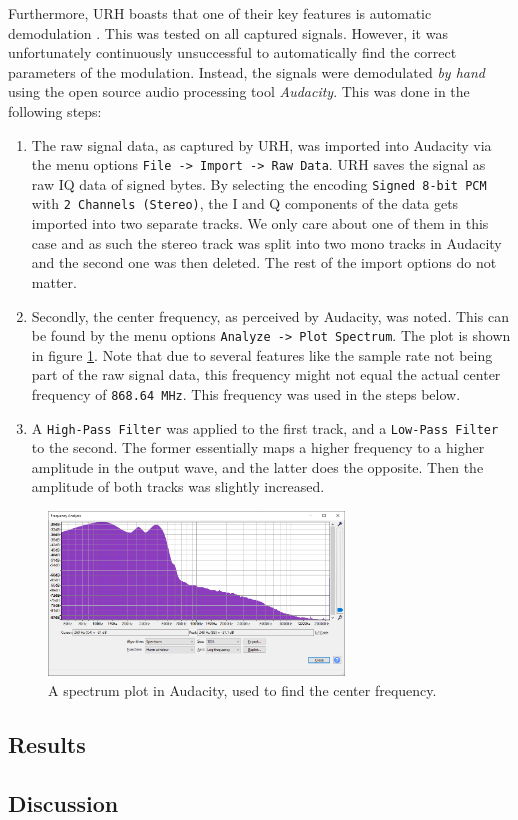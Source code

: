 Furthermore, \gls{URH} boasts that one of their key features is automatic demodulation \cite{urh}. This was tested on all captured signals. However, it was unfortunately continuously unsuccessful to automatically find the correct parameters of the modulation. Instead, the signals were demodulated \textit{by hand} using the open source audio processing tool \textit{Audacity}. This was done in the following steps:
\begin{enumerate}
    \item The raw signal data, as captured by URH, was imported into Audacity via the menu options \texttt{File -> Import -> Raw Data}. URH saves the signal as raw IQ data of signed bytes. By selecting the encoding \texttt{Signed 8-bit PCM} with \texttt{2 Channels (Stereo)}, the I and Q components of the data gets imported into two separate tracks. We only care about one of them in this case and as such the stereo track was split into two mono tracks in Audacity and the second one was then deleted. The rest of the import options do not matter.
    \item Secondly, the center frequency, as perceived by Audacity, was noted. This can be found by the menu options \texttt{Analyze -> Plot Spectrum}. The plot is shown in figure \ref{fig:audacity-spectrum}. Note that due to several features like the sample rate not being part of the raw signal data, this frequency might not equal the actual center frequency of \texttt{868.64 MHz}. This frequency was used in the steps below.
    \item A \texttt{High-Pass Filter} was applied to the first track, and a \texttt{Low-Pass Filter} to the second. The former essentially maps a higher frequency to a higher amplitude in the output wave, and the latter does the opposite. Then the amplitude of both tracks was slightly increased.
\end{enumerate}
\begin{figure}[!ht]
    \centering
    \includegraphics[width=0.7\textwidth]{images/6-pentesting/audacity-spectrum.png}
    \caption{A spectrum plot in Audacity, used to find the center frequency.}
    \label{fig:audacity-spectrum}
\end{figure}

\subsection{Results}
\todo

\subsection{Discussion}
\todo
